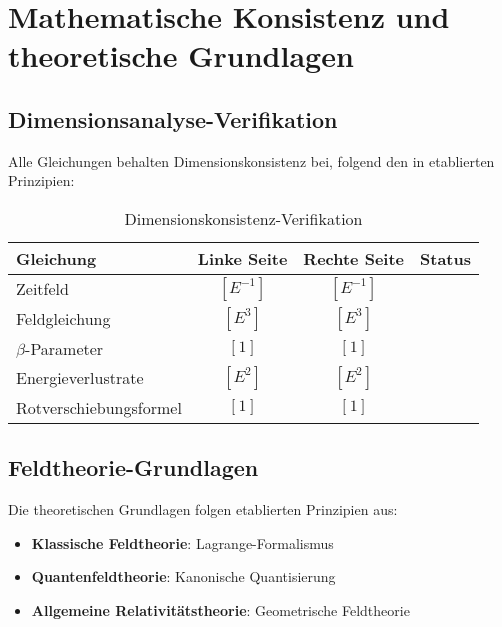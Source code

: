 \documentclass[12pt,a4paper]{article}
\begin{document}
	\section{Mathematische Konsistenz und theoretische Grundlagen}
	\label{sec:mathematical_consistency}
	
	\subsection{Dimensionsanalyse-Verifikation}
	\label{subsec:dimensional_verification}
	
	Alle Gleichungen behalten Dimensionskonsistenz bei, folgend den in \citep{barenblatt1996,bridgman1922} etablierten Prinzipien:
	
	\begin{table}[htbp]
		\centering
		\begin{tabular}{lccl}
			\toprule
			\textbf{Gleichung} & \textbf{Linke Seite} & \textbf{Rechte Seite} & \textbf{Status} \\
			\midrule
			Zeitfeld & $[E^{-1}]$ & $[E^{-1}]$ & \checkmark \\
			Feldgleichung & $[E^3]$ & $[E^3]$ & \checkmark \\
			$\beta$-Parameter & $[1]$ & $[1]$ & \checkmark \\
			Energieverlustrate & $[E^2]$ & $[E^2]$ & \checkmark \\
			Rotverschiebungsformel & $[1]$ & $[1]$ & \checkmark \\
			\bottomrule
		\end{tabular}
		\caption{Dimensionskonsistenz-Verifikation}
		\label{tab:dimensional_check}
	\end{table}
	
	\subsection{Feldtheorie-Grundlagen}
	\label{subsec:field_theory_foundations}
	
	Die theoretischen Grundlagen folgen etablierten Prinzipien aus:
	\begin{itemize}
		\item \textbf{Klassische Feldtheorie}: Lagrange-Formalismus \citep{goldstein2001,landau1975}
		\item \textbf{Quantenfeldtheorie}: Kanonische Quantisierung \citep{peskin1995,weinberg1995}
		\item \textbf{Allgemeine Relativitätstheorie}: Geometrische Feldtheorie \citep{misner1973,carroll2004}
	\end{itemize}
	
\end{document}
